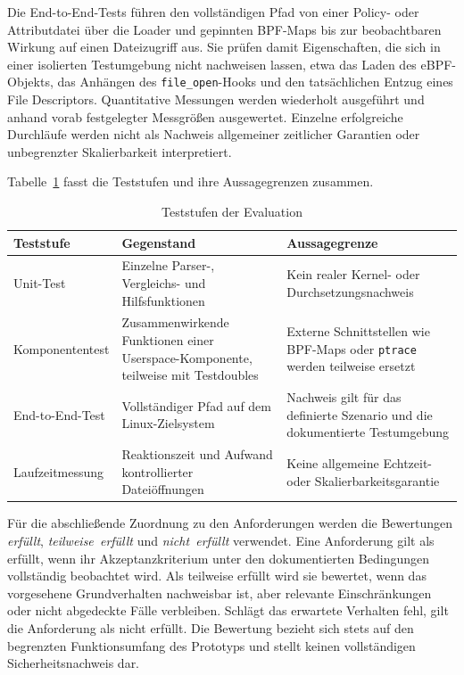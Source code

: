 Die End-to-End-Tests führen den vollständigen Pfad von einer Policy- oder Attributdatei über die
Loader und gepinnten BPF-Maps bis zur beobachtbaren Wirkung auf einen Dateizugriff aus. Sie prüfen
damit Eigenschaften, die sich in einer isolierten Testumgebung nicht nachweisen lassen, etwa das
Laden des eBPF-Objekts, das Anhängen des \texttt{file\_open}-Hooks und den tatsächlichen Entzug
eines File Descriptors. Quantitative Messungen werden wiederholt ausgeführt und anhand vorab
festgelegter Messgrößen ausgewertet. Einzelne erfolgreiche Durchläufe werden nicht als Nachweis
allgemeiner zeitlicher Garantien oder unbegrenzter Skalierbarkeit interpretiert.

Tabelle~\ref{tab:teststufen} fasst die Teststufen und ihre Aussagegrenzen zusammen.

\begin{table}[htbp]
    \centering
    \begin{tabular}{p{}p{}p{}}
        \hline
        \textbf{Teststufe} & \textbf{Gegenstand} & \textbf{Aussagegrenze} \\
        \hline
        Unit-Test & Einzelne Parser-, Vergleichs- und Hilfsfunktionen & Kein realer Kernel- oder
        Durchsetzungsnachweis \\
        Komponententest & Zusammenwirkende Funktionen einer Userspace-Komponente, teilweise mit
        Testdoubles & Externe Schnittstellen wie BPF-Maps oder \texttt{ptrace} werden teilweise
        ersetzt \\
        End-to-End-Test & Vollständiger Pfad auf dem Linux-Zielsystem & Nachweis gilt für das
        definierte Szenario und die dokumentierte Testumgebung \\
        Laufzeitmessung & Reaktionszeit und Aufwand kontrollierter Dateiöffnungen & Keine
        allgemeine Echtzeit- oder Skalierbarkeitsgarantie \\
        \hline
    \end{tabular}
    \caption{Teststufen der Evaluation}
    \label{tab:teststufen}
\end{table}

Für die abschließende Zuordnung zu den Anforderungen werden die Bewertungen \emph{erfüllt},
\emph{teilweise~erfüllt} und \emph{nicht~erfüllt} verwendet. Eine
Anforderung gilt als erfüllt, wenn ihr Akzeptanzkriterium unter den dokumentierten Bedingungen
vollständig beobachtet wird. Als teilweise erfüllt wird sie bewertet, wenn das vorgesehene
Grundverhalten nachweisbar ist, aber relevante Einschränkungen oder nicht abgedeckte Fälle
verbleiben. Schlägt das erwartete Verhalten fehl, gilt die Anforderung als nicht erfüllt.
Die Bewertung bezieht sich
stets auf den begrenzten Funktionsumfang des Prototyps und stellt keinen vollständigen
Sicherheitsnachweis dar.

